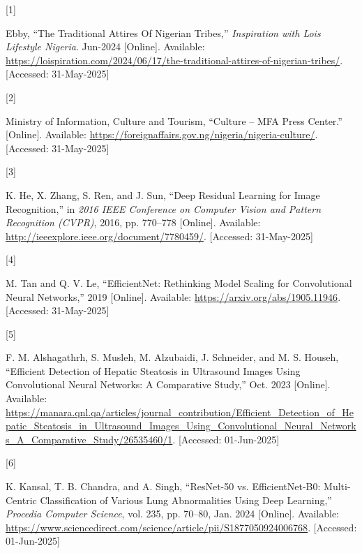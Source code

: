 \documentclass[
  journal,
]{IEEEtran}%
\newlength{\cslhangindent}
\newlength{\csllabelwidth}
\newenvironment{CSLReferences}[2] %
 {\begin{list}{}{%
  \setlength{\itemindent}{0pt}
  \setlength{\leftmargin}{0pt}
  \setlength{\parsep}{0pt}
  \ifodd #1
   \setlength{\leftmargin}{\cslhangindent}
   \setlength{\itemindent}{-1\cslhangindent}
  \fi
  \setlength{\itemsep}{#2\baselineskip}}}
 {\end{list}}
\newcommand{\CSLLeftMargin}[1]{\parbox[t]{\csllabelwidth}{\strut#1\strut}}
\newcommand{\CSLRightInline}[1]{\parbox[t]{\linewidth - \csllabelwidth}{\strut#1\strut}}
\begin{document}
\label{refs}
\begin{CSLReferences}{0}{0}
\CSLLeftMargin{{[}1{]} }%
\CSLRightInline{Ebby, {``The {Traditional} {Attires} {Of} {Nigerian}
{Tribes},''} \emph{Inspiration with Lois{\textbar} Lifestyle {\textbar}
Nigeria}. Jun-2024 {[}Online{]}. Available:
\url{https://loispiration.com/2024/06/17/the-traditional-attires-of-nigerian-tribes/}.
{[}Accessed: 31-May-2025{]}}

\CSLLeftMargin{{[}2{]} }%
\CSLRightInline{Ministry of Information, Culture and Tourism, {``Culture
-- {MFA} {Press} {Center}.''} {[}Online{]}. Available:
\url{https://foreignaffairs.gov.ng/nigeria/nigeria-culture/}.
{[}Accessed: 31-May-2025{]}}

\CSLLeftMargin{{[}3{]} }%
\CSLRightInline{K. He, X. Zhang, S. Ren, and J. Sun, {``Deep {Residual}
{Learning} for {Image} {Recognition},''} in \emph{2016 {IEEE}
{Conference} on {Computer} {Vision} and {Pattern} {Recognition}
({CVPR})}, 2016, pp. 770--778 {[}Online{]}. Available:
\url{http://ieeexplore.ieee.org/document/7780459/}. {[}Accessed:
31-May-2025{]}}

\CSLLeftMargin{{[}4{]} }%
\CSLRightInline{M. Tan and Q. V. Le, {``{EfficientNet}: {Rethinking}
{Model} {Scaling} for {Convolutional} {Neural} {Networks},''} 2019
{[}Online{]}. Available: \url{https://arxiv.org/abs/1905.11946}.
{[}Accessed: 31-May-2025{]}}

\CSLLeftMargin{{[}5{]} }%
\CSLRightInline{F. M. Alshagathrh, S. Musleh, M. Alzubaidi, J.
Schneider, and M. S. Househ, {``Efficient {Detection} of {Hepatic}
{Steatosis} in {Ultrasound} {Images} {Using} {Convolutional} {Neural}
{Networks}: {A} {Comparative} {Study},''} Oct. 2023 {[}Online{]}.
Available:
\url{https://manara.qnl.qa/articles/journal_contribution/Efficient_Detection_of_Hepatic_Steatosis_in_Ultrasound_Images_Using_Convolutional_Neural_Networks_A_Comparative_Study/26535460/1}.
{[}Accessed: 01-Jun-2025{]}}

\CSLLeftMargin{{[}6{]} }%
\CSLRightInline{K. Kansal, T. B. Chandra, and A. Singh, {``{ResNet}-50
vs. {EfficientNet}-{B0}: {Multi}-{Centric} {Classification} of {Various}
{Lung} {Abnormalities} {Using} {Deep} {Learning},''} \emph{Procedia
Computer Science}, vol. 235, pp. 70--80, Jan. 2024 {[}Online{]}.
Available:
\url{https://www.sciencedirect.com/science/article/pii/S1877050924006768}.
{[}Accessed: 01-Jun-2025{]}}


\end{CSLReferences}
\end{document}
